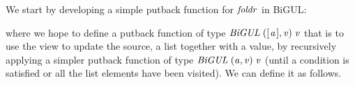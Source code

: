 We start by developing a simple putback function for \ensuremath{\Varid{foldr}} in BiGUL:
\resethooks
where we hope to define a putback function of type \ensuremath{\Conid{BiGUL}\;([\mskip1.5mu \Varid{a}\mskip1.5mu],\Varid{v})\;\Varid{v}}
that is to use the view to update the source, 
a list together with a value, by recursively applying
a simpler putback function of type \ensuremath{\Conid{BiGUL}\;(\Varid{a},\Varid{v})\;\Varid{v}}
(until a condition is satisfied or all the list elements have been visited).
We can define it as follows.
